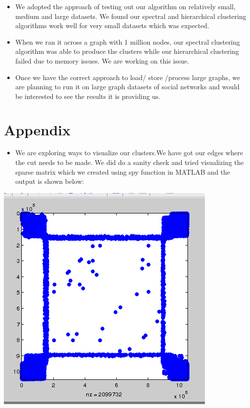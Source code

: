 \documentclass[11pt]{exam}
\begin{document}
\begin{itemize}

\item We adopted the approach of testing out our algorithm on relatively small, medium and large datasets. We found our spectral and hierarchical clustering algorithms work well for very small datasets which was expected.

\item When we ran it across a graph with 1 million nodes, our spectral clustering algorithm was able to produce the clusters while our hierarchical clustering failed due to memory issues. We are working on this issue.

\item Once we have the correct approach to load/ store /process large graphs, we are planning to run it on large graph datasets of social networks and would be interested to see the results it is providing us.
\end{itemize}


\section{Appendix}

\begin{itemize}
	\item We are exploring ways to visualize our clusters.We have got our edges where the cut needs to be made. We did do a sanity check and tried visualizing the sparse matrix which we created using spy function in MATLAB and the output is shown below:
\end{itemize}

\begin{center}
	
	\includegraphics[width=.7\linewidth]{spec10.png}
	
	
\end{center}
\end{document}
